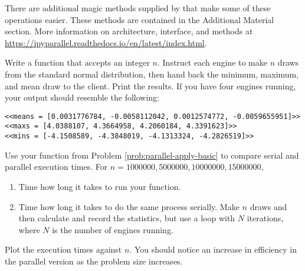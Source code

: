 %

There are additional magic methods supplied by  that make some of these operations easier.
These methods are contained in the Additional Material section.
More information on  architecture, interface, and methods at \url{https://ipyparallel.readthedocs.io/en/latest/index.html}.


\begin{problem}
Write a function that accepts an integer $n$.
Instruct each engine to make $n$ draws from the standard normal distribution, then hand back the minimum, maximum, and mean draw to the client.
Print the results.
If you have four engines running, your output should resemble the following:
\begin{lstlisting}
<<means = [0.0031776784, -0.0058112042, 0.0012574772, -0.0059655951]>>
<<maxs = [4.0388107, 4.3664958, 4.2060184, 4.3391623]>>
<<mins = [-4.1508589, -4.3848019, -4.1313324, -4.2826519]>>
\end{lstlisting}
\label{prob:parallel-apply-basic}
\end{problem}

\begin{problem}
Use your function from Problem \ref{prob:parallel-apply-basic} to compare serial and parallel execution times.
For $n = 1000000, 5000000, 10000000, 15000000,$
\begin{enumerate}
\item Time how long it takes to run your function.
\item Time how long it takes to do the same process serially. Make $n$ draws and then calculate and record the statistics, but use a  loop with $N$ iterations, where $N$ is the number of engines running.
\end{enumerate}
Plot the execution times against $n$.
You should notice an increase in efficiency in the parallel version as the problem size increases.
\end{problem}


